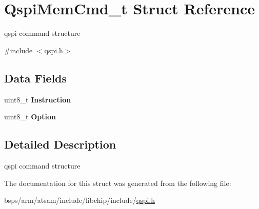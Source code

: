 \hypertarget{structQspiMemCmd__t}{}\section{Qspi\+Mem\+Cmd\+\_\+t Struct Reference}
\label{structQspiMemCmd__t}


qspi command structure  




{\ttfamily \#include $<$qspi.\+h$>$}

\subsection*{Data Fields}
\begin{DoxyCompactItemize}
\item 
\mbox{\label{structQspiMemCmd__t_a4f7a1dad19fffda8a8cf9a7d93caeac8}} 
uint8\+\_\+t {\bfseries Instruction}
\item 
\mbox{\label{structQspiMemCmd__t_a8d94b5897cc07aba870381834e911149}} 
uint8\+\_\+t {\bfseries Option}
\end{DoxyCompactItemize}


\subsection{Detailed Description}
qspi command structure 

The documentation for this struct was generated from the following file\+:\begin{DoxyCompactItemize}
\item 
bsps/arm/atsam/include/libchip/include/\mbox{\hyperlink{qspi_8h}{qspi.\+h}}\end{DoxyCompactItemize}
